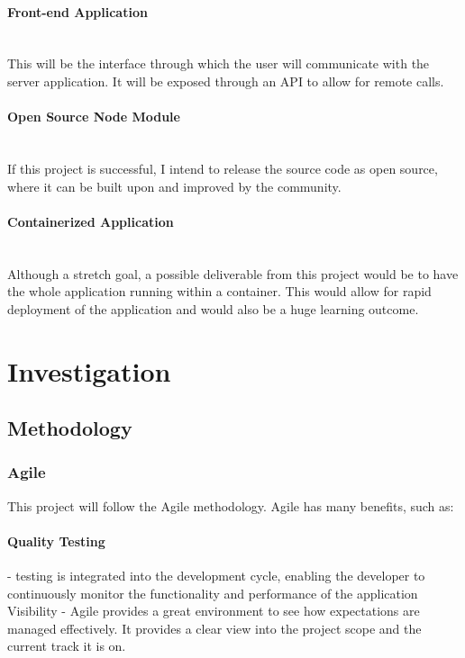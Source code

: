 \documentclass{article}
\begin{document}
\paragraph{Front-end Application}\mbox{}\\
This will be the interface through which the user will communicate with the server application. It will be exposed through an API to allow for remote calls.

\paragraph{Open Source Node Module}\mbox{}\\
If this project is successful, I intend to release the source code as open source, where it can be built upon and improved by the community.

\paragraph{Containerized Application}\mbox{}\\
Although a stretch goal, a possible deliverable from this project would be to have the whole application running within a container. This would allow for rapid deployment of the application and would also be a huge learning outcome.


\section{Investigation}

\subsection{Methodology}

\subsubsection{Agile}
\label{subs:agile}
This project will follow the Agile methodology. Agile has many benefits, such as:

\paragraph{Quality Testing}- testing is integrated into the development cycle, enabling the developer to continuously monitor the functionality and performance of the application
Visibility - Agile provides a great environment to see how expectations are managed effectively. It provides a clear view into the project scope and the current track it is on.
\end{document}
